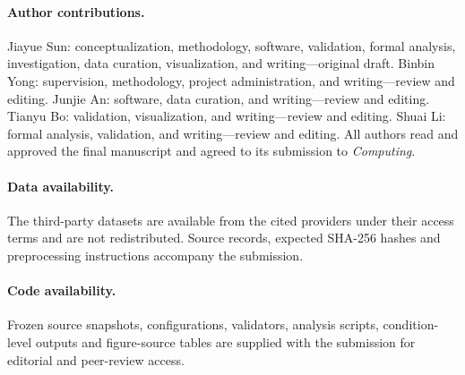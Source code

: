 \documentclass[smallextended]{svjour3}
\begin{document}
\paragraph{Author contributions.} Jiayue Sun: conceptualization, methodology, software, validation, formal analysis, investigation, data curation, visualization, and writing---original draft. Binbin Yong: supervision, methodology, project administration, and writing---review and editing. Junjie An: software, data curation, and writing---review and editing. Tianyu Bo: validation, visualization, and writing---review and editing. Shuai Li: formal analysis, validation, and writing---review and editing. All authors read and approved the final manuscript and agreed to its submission to \textit{Computing}.
\paragraph{Data availability.} The third-party datasets are available from the cited providers under their access terms and are not redistributed. Source records, expected SHA-256 hashes and preprocessing instructions accompany the submission.
\paragraph{Code availability.} Frozen source snapshots, configurations, validators, analysis scripts, condition-level outputs and figure-source tables are supplied with the submission for editorial and peer-review access.

\end{document}
